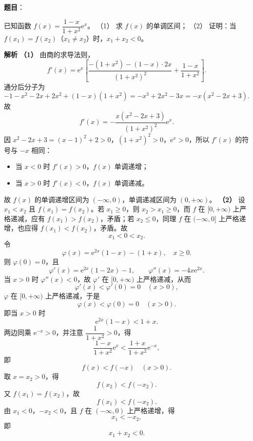 \begin{answer}


\end{answer}
\begin{answer}

\textbf{题目}：

已知函数 $f(x)=\dfrac{1-x}{1+x^2}\mathrm e^x$。
（1） 求 $f(x)$ 的单调区间；
（2） 证明：当 $f(x_1)=f(x_2)$（$x_1\ne x_2$）时，$x_1+x_2<0$。

\textbf{解析}
\textbf{（1）} 由商的求导法则，
\nopagebreak[4]
\[f'(x)=\mathrm e^x\left[\frac{-(1+x^2)-(1-x)\cdot2x}{(1+x^2)^2}+\frac{1-x}{1+x^2}\right].\]
通分后分子为
\nopagebreak[4]
\[-1-x^2-2x+2x^2+(1-x)(1+x^2)=-x^3+2x^2-3x=-x(x^2-2x+3).\]
故
\nopagebreak[4]
\[f'(x)=-\frac{x(x^2-2x+3)}{(1+x^2)^2}\mathrm e^x.\]
因 $x^2-2x+3=(x-1)^2+2>0$，$(1+x^2)^2>0$，$\mathrm e^x>0$，所以 $f'(x)$ 的符号与 $-x$ 相同：
\begin{itemize}
\item 当 $x<0$ 时 $f'(x)>0$，$f(x)$ 单调递增；
\item 当 $x>0$ 时 $f'(x)<0$，$f(x)$ 单调递减。
\end{itemize}
故 $f(x)$ 的单调递增区间为 $(-\infty,0)$，单调递减区间为 $(0,+\infty)$。
\textbf{（2）} 设 $x_1<x_2$ 且 $f(x_1)=f(x_2)$。若 $x_1\geqslant0$，则 $x_2>x_1\geqslant0$，而 $f$ 在 $[0,+\infty)$ 上严格递减，应有 $f(x_1)>f(x_2)$，矛盾；若 $x_2\leqslant0$，同理 $f$ 在 $(-\infty,0]$ 上严格递增，也应得 $f(x_1)<f(x_2)$，矛盾。故
\nopagebreak[4]
\[x_1<0<x_2.\]
令
\nopagebreak[4]
\[\varphi(x)=\mathrm e^{2x}(1-x)-(1+x),\quad x\geqslant0.\]
则 $\varphi(0)=0$，且
\nopagebreak[4]
\[\varphi'(x)=\mathrm e^{2x}(1-2x)-1,\qquad\varphi''(x)=-4x\mathrm e^{2x}.\]
当 $x>0$ 时 $\varphi''(x)<0$，故 $\varphi'$ 在 $[0,+\infty)$ 上严格递减，从而
\nopagebreak[4]
\[\varphi'(x)<\varphi'(0)=0\quad(x>0),\]
$\varphi$ 在 $[0,+\infty)$ 上严格递减，于是
\nopagebreak[4]
\[\varphi(x)<\varphi(0)=0\quad(x>0).\]
即当 $x>0$ 时
\nopagebreak[4]
\[\mathrm e^{2x}(1-x)<1+x.\]
两边同乘 $\mathrm e^{-x}>0$，并注意 $\dfrac1{1+x^2}>0$，得
\nopagebreak[4]
\[\frac{1-x}{1+x^2}\mathrm e^x<\frac{1+x}{1+x^2}\mathrm e^{-x},\]
即
\nopagebreak[4]
\[f(x)<f(-x)\quad(x>0).\]
取 $x=x_2>0$，得
\nopagebreak[4]
\[f(x_2)<f(-x_2).\]
又 $f(x_1)=f(x_2)$，故
\nopagebreak[4]
\[f(x_1)<f(-x_2).\]
由 $x_1<0$，$-x_2<0$，且 $f$ 在 $(-\infty,0)$ 上严格递增，得
\nopagebreak[4]
\[x_1<-x_2,\]
即
\nopagebreak[4]
\[x_1+x_2<0.\]



\end{answer}